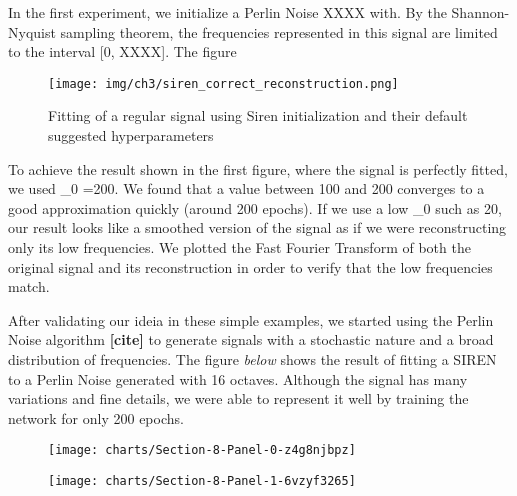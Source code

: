 In the first experiment, we initialize a Perlin Noise XXXX with. By the Shannon-Nyquist sampling theorem, the frequencies represented in this signal are limited to the interval [0, XXXX]. The figure 

\begin{figure}
    \texttt{[image: img/ch3/siren\_correct\_reconstruction.png]}
    \caption{Fitting of a regular signal using Siren initialization and their default suggested hyperparameters}
\end{figure}



To achieve the result shown in the first figure, where the signal is perfectly fitted, we used \omega_0 =200. We found that a value between 100 and 200 converges to a good approximation quickly (around 200 epochs). If we use a low \omega_0 such as 20, our result looks like a smoothed version of the signal as if we were reconstructing only its low frequencies. We plotted the Fast Fourier Transform of both the original signal and its reconstruction in order to verify that the low frequencies match. 

 After validating our ideia in these simple examples, we started using the Perlin Noise algorithm \textbf{[cite]} to generate signals with a stochastic nature and a broad distribution of frequencies. 
The figure \textit{below} shows the result of fitting a SIREN to a Perlin Noise generated with 16 octaves. Although the signal has many variations and fine details, we were able to represent it well by training the network for only 200 epochs.

\begin{figure}[!htb]
\texttt{[image: charts/Section-8-Panel-0-z4g8njbpz]}
\caption{}
\endminipage\hfill
{}
\texttt{[image: charts/Section-8-Panel-1-6vzyf3265]}
\caption{}
\endminipage
\end{figure}

